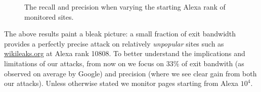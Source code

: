 \begin{figure}[t]
\centering
{}
\caption{The recall and precision when varying the starting Alexa rank of
monitored sites.}
\label{fig:wfdns:alexa}
\end{figure}

The above results paint a bleak picture: a small fraction of exit
bandwidth provides a perfectly precise attack on relatively
\emph{unpopular} sites such as \url{wikileaks.org} at Alexa rank 10808.
To better understand the implications and limitations of our attacks,
from now on we focus on
33\% of exit bandwith (as observed on average by Google) and
precision (where we see clear gain from both our attacks).
Unless otherwise stated
we monitor pages starting from Alexa $10^4$.

